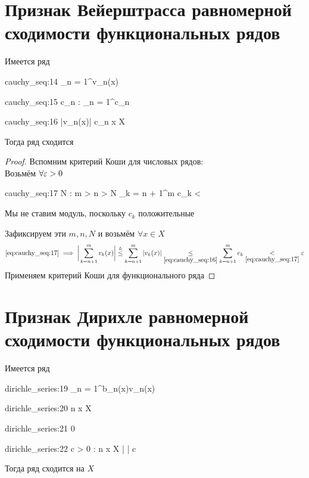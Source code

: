 \section{Признак Вейерштрасса равномерной сходимости функциональных рядов}

\begin{theorem}
	Имеется ряд
	\begin{equ}{cauchy_seq:14}
		\sum_{n = 1}^\infty v_n(x)
	\end{equ}
	\begin{equ}{cauchy_seq:15}
		\exist c_n : \quad \sum_{n = 1}^\infty c_n 
	\end{equ}
	\begin{equ}{cauchy_seq:16}
		|v_n(x)| \le c_n \quad \forall x \in X
	\end{equ}
	Тогда ряд  сходится 
\end{theorem}

\begin{proof}
	Вспомним критерий Коши для числовых рядов: \\
	Возьмём $ \forall \varepsilon > 0 $
	\begin{equ}{cauchy_seq:17}
		 \implies \exist N : \quad \forall m > n > N \quad \sum_{k = n + 1}^m c_k < \veps
	\end{equ}
	\begin{note}
		Мы не ставим модуль, поскольку $ c_k $ положительные
	\end{note}
	Зафиксируем эти $ m, n, N $ и возьмём $ \forall x \in X $
	$$ \eref{cauchy_seq:17} \implies \bigg| \sum_{k = n + 1}^m v_k(x) \bigg| \trile \sum_{k = n + 1}^m |v_k(x)|\underset{\eref{cauchy_seq:16}}\le \sum_{k = n + 1}^m c_k \underset{\eref{cauchy_seq:17}}< \veps $$
	Применяем критерий Коши для функционального ряда
\end{proof}

\section{Признак Дирихле равномерной сходимости функциональных рядов}

\begin{theorem}
	Имеется ряд
	\begin{equ}{dirichle_series:19}
		\sum_{n = 1}^\infty b_n(x)v_n(x)
	\end{equ}
	\begin{equ}{dirichle_series:20}
		  n \quad \forall {} x \in X
	\end{equ}
	\begin{equ}{dirichle_series:21}
		  0
	\end{equ}
	\begin{equ}{dirichle_series:22}
		\exist c > 0 : \quad \forall n \quad \forall x \in X \quad \bigg|  \bigg| \bm\le c
	\end{equ}
	Тогда ряд   сходится на $ X $
\end{theorem}

